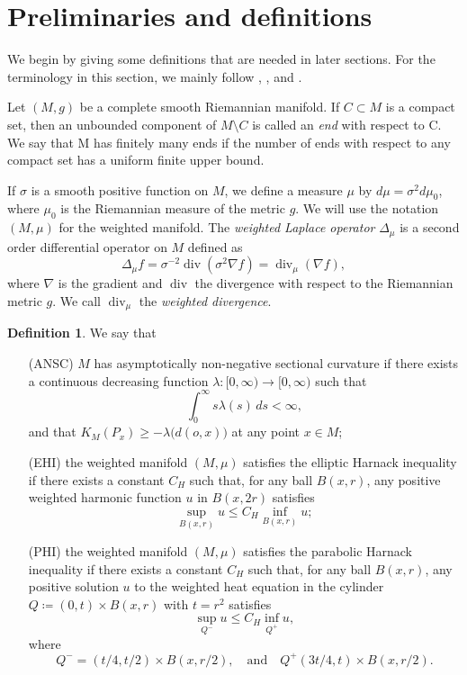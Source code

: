 \documentclass[10pt,a4paper,reqno]{amsart}
\DeclareMathOperator\dv{div}
\numberwithin{equation}{section}
\theoremstyle{plain}
\theoremstyle{definition}
\newtheorem{defin}[thm]{Definition}
\begin{document}
\section{Preliminaries and definitions}\label{sec-preli}

We begin by giving some definitions that are needed in later sections. For the terminology 
in this section, we mainly follow \cite{grisal}, \cite{litam}, and \cite{holDuke}.

Let $(M,g)$ be a complete smooth Riemannian manifold. If $C\subset M$ is a compact set, then an unbounded component 
of $M\setminus C$ is called an \emph{end} with respect to C. We say that M has finitely many
ends if the number of ends with respect to any compact set has a uniform finite upper bound. 

If $\sigma$ is a smooth positive function on $M$, we define 
a measure $\mu$ by $d\mu = \sigma^2 d\mu_0$, where $\mu_0$ is the Riemannian measure of the metric $g$.
We will use the notation $(M,\mu)$ for the weighted manifold.
The \emph{weighted Laplace operator} $\Delta_\mu$ is a second order differential operator on $M$ 
defined as
    \begin{equation}\label{weightlaplace}
      \Delta_\mu f = \sigma^{-2} \dv (\sigma^2 \nabla f) = \dv_\mu (\nabla f),
    \end{equation}
where $\nabla$ is the gradient and $\dv$ the divergence with respect to the Riemannian metric $g$.
We call $\dv_\mu$ the \emph{weighted divergence}.

\begin{defin}\label{def-notions}
	We say that
	\begin{enumerate}
	\item[(ANSC)] $M$ has asymptotically non-negative sectional curvature if there exists a continuous 
	decreasing function $\lambda \colon [0,\infty) \to [0,\infty)$ such that 
		\[
			\int_0^\infty s\lambda(s) \,ds < \infty,
		\]
	and that $K_M(P_x) \ge -\lambda\bigl(d(o,x)\bigr)$ at any point $x \in M$; 
	
	\item[(EHI)] the weighted manifold $(M,\mu)$ satisfies the elliptic Harnack inequality if there exists a constant $C_H$ such that,
	for any ball $B(x,r)$, any positive weighted harmonic function $u$ in $B(x,2r)$ satisfies
		\[
			\sup_{B(x,r)} u \le C_H \inf_{B(x,r)} u;
		\] 
	\item[(PHI)] the weighted manifold $(M,\mu)$ satisfies the parabolic Harnack inequality if there exists a constant $C_H$ such that,
	for any ball $B(x,r)$, any positive solution $u$ to the weighted heat equation in the cylinder $Q\coloneqq
	(0,t)\times B(x,r)$ with $t=r^2$ satisfies 
		\[
			\sup_{Q^-} u \le C_H \inf_{Q^+} u,
		\]
	where 
		\[
			Q^- = (t/4,t/2) \times B(x,r/2), \quad \text{and} \quad Q^+(3t/4,t) \times B(x,r/2).
		\]
	\end{enumerate}
\end{defin}
\end{document}

